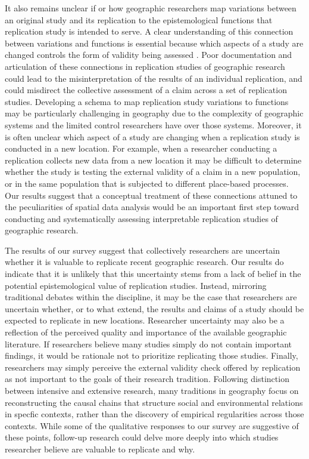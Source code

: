 \documentclass[]{interact}
\theoremstyle{plain}%
\theoremstyle{definition}
\theoremstyle{remark}
\begin{document}
It also remains unclear if or how geographic researchers map variations between an original study and its replication to the epistemological functions that replication study is intended to serve.
A clear understanding of this connection between variations and functions is essential because which aspects of a study are changed controls the form of validity being assessed \citep{gomez2010replications, radder2003, schmidt2009}.
Poor documentation and articulation of these connections in replication studies of geographic research could lead to the misinterpretation of the results of an individual replication, and could misdirect the collective assessment of a claim across a set of replication studies.
Developing a schema to map replication study variations to functions may be particularly challenging in geography due to the complexity of geographic systems and the limited control researchers have over those systems. 
Moreover, it is often unclear which aspect of a study are changing when a replication study is conducted in a new location. 
For example, when a researcher conducting a replication collects new data from a new location it may be difficult to determine whether the study is testing the external validity of a claim in a new population, or in the same population that is subjected to different place-based processes.
Our results suggest that a conceptual treatment of these connections attuned to the peculiarities of spatial data analysis would be an important first step toward conducting and systematically assessing interpretable replication studies of geographic research. 

The results of our survey suggest that collectively researchers are uncertain whether it is valuable to replicate recent geographic research. 
Our results do indicate that it is unlikely that this uncertainty stems from a lack of belief in the potential epistemological value of replication studies.
Instead, mirroring traditional debates within the discipline, it may be the case that researchers are uncertain whether, or to what extend, the results and claims of a study should be expected to replicate in new locations. 
Researcher uncertainty may also be a reflection of the perceived quality and importance of the available geographic literature. 
If researchers believe many studies simply do not contain important findings, it would be rationale not to prioritize replicating those studies.
Finally, researchers may simply perceive the external validity check offered by replication as not important to the goals of their research tradition. 
Following \citet{sayer1992method} distinction between intensive and extensive research, many traditions in geography focus on reconstructing the causal chains that structure social and environmental relations in specfic contexts, rather than the discovery of empirical regularities across those contexts. 
While some of the qualitative responses to our survey are suggestive of these points, follow-up research could delve more deeply into which studies researcher believe are valuable to replicate and why.
\end{document}
